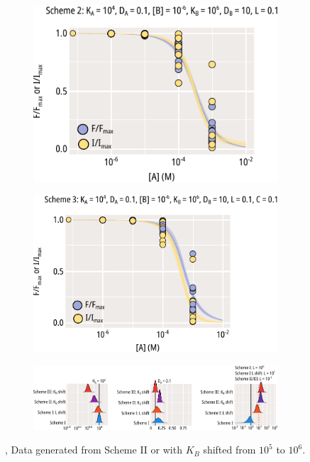 \begin{figure}[h]
	\centering
	\begin{subfigure}[t]{0.45\textwidth}
		\caption{}\label{ch4fig:scheme_2_kb_shift}
		\centering
		\includegraphics[width=\textwidth]{mwc_scheme_2_kb_shift.pdf}
	\end{subfigure}
	\hfill
	\begin{subfigure}[t]{0.45\textwidth}
		\caption{}\label{ch4fig:scheme_3_kb_shift}
		\centering
		\includegraphics[width=\textwidth]{mwc_scheme_3_kb_shift.pdf}
	\end{subfigure}
	\vfill
	\begin{subfigure}[t]{0.9\textwidth}
		\caption{}\label{ch4fig:mwc_params_3}
		\centering
		\includegraphics[width=\textwidth]{mwc_scheme_param_fits_3.pdf}
	\end{subfigure}
	\caption[Parameter retrieval from MWC models]{
	,  Data generated from  Scheme II  or  with $K_B$ shifted from $10^5$ to $10^6$.
	}\label{ch4fig:scheme_2_3_shifts}
\end{figure}

